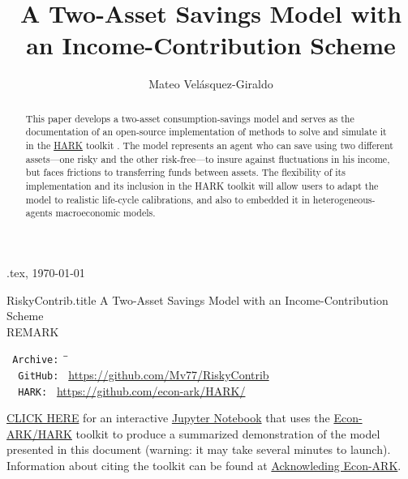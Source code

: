\documentclass[./RiskyContrib.tex]{subfiles}
\begin{document}
\hfill{\tiny \texname.tex, \today}

\begin{verbatimwrite}{RiskyContrib.title}  %
A Two-Asset Savings Model with an Income-Contribution Scheme\\
REMARK
\end{verbatimwrite}

\title{A Two-Asset Savings Model with an Income-Contribution Scheme}

\author{Mateo Vel\'asquez-Giraldo}


\maketitle 

\hypertarget{abstract}{}
\begin{abstract}
This paper develops a two-asset consumption-savings model and serves as
the documentation of an open-source implementation of methods to solve and
simulate it in the \href{https://econ-ark.org/toolkit}{HARK}
toolkit \citep{carroll2018HARK}. The model represents an agent who can
save using two different assets---one risky and the other risk-free---to insure
against fluctuations in his income, but faces frictions to transferring funds between
assets. The flexibility of its implementation and its inclusion in the HARK
toolkit will allow users to adapt the model to realistic life-cycle calibrations, and
also to embedded it in heterogeneous-agents macroeconomic models.
\end{abstract}

\hypertarget{links}{}
\begin{small}
\parbox{\textwidth}{
\begin{center}
\begin{tabbing}
\texttt{~Archive:~} \= \=  \kill \\  %
\texttt{~~GitHub:~} \> \> \url{https://github.com/Mv77/RiskyContrib} \\
\texttt{~~HARK:~} \> \> \url{https://github.com/econ-ark/HARK/} \\
\end{tabbing}
\end{center}
          
\href{https://mybinder.org/v2/gh/Mv77/RiskyContrib/main?filepath=Code\%2FPython\%2FRiskyContrib.ipynb}{CLICK HERE}
for an interactive \href{https://en.wikipedia.org/wiki/Project\_Jupyter\#Jupyter_Notebook}{Jupyter Notebook} that
uses the \href{https://econ-ark/HARK}{Econ-ARK/HARK} toolkit to produce a summarized demonstration of the model
presented in this document (warning: it may take several minutes to launch).  Information about citing the toolkit can be found at \href{https://econ-ark.org/acknowledging/}{Acknowleding Econ-ARK}.
} %
\end{small}
\end{document}
